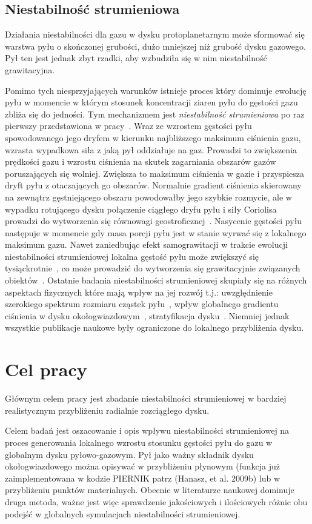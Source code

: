 \subsection{Niestabilność strumieniowa}
Działania niestabilności dla gazu w dysku protoplanetarnym może sformować
się warstwa pyłu o skończonej grubości, dużo mniejszej niż grubość dysku
gazowego. Pył ten jest jednak zbyt rzadki, aby wzbudziła się w nim
niestabilność grawitacyjna.
\par Pomimo tych niesprzyjających warunków istnieje proces który dominuje
ewolucję pyłu w momencie w którym stosunek koncentracji ziaren pyłu do gęstości
gazu zbliża się do jedności. Tym mechanizmem jest {\it niestabilność
strumieniowa} po raz pierwszy przedstawiona w pracy~\cite{YG05}.  Wraz ze
wzrostem gęstości pyłu spowodowanego jego dryfem w kierunku najbliższego
maksimum ciśnienia gazu, wzrasta wypadkowa siła z jaką pył oddziałuje na gaz.
Prowadzi to zwiększenia prędkości gazu i wzrostu ciśnienia na skutek zagarniania
obszarów gazów poruszających się wolniej. Zwiększa to maksimum ciśnienia w gazie
i przyspiesza dryft pyłu z otaczających go obszarów. Normalnie gradient ciśnienia
skierowany na zewnątrz gęstniejącego obszaru powodowałby jego szybkie rozmycie,
ale w wypadku rotującego dysku połączenie ciągłego dryfu pyłu i siły Coriolisa
prowadzi do wytworzenia się równowagi geostroficznej~\cite{jaquet}. Nasycenie
gęstości pyłu następuje w momencie gdy masa porcji pyłu jest w stanie wyrwać się
z lokalnego maksimum gazu.  Nawet zaniedbując efekt samograwitacji w trakcie
ewolucji niestabilności strumieniowej lokalna gęstość pyłu może zwiększyć się
tysiąckrotnie~\cite{JY07}, co może prowadzić do wytworzenia się grawitacyjnie
związanych obiektów~\cite{J07}. Ostatnie badania niestabilności strumieniowej
skupiały się na różnych aspektach fizycznych które mają wpływ na jej rozwój
t.j.: uwzględnienie szerokiego spektrum rozmiaru cząstek pyłu~\cite{BS10a},
wpływ globalnego gradientu ciśnienia w dysku okołogwiazdowym~\cite{BS10b},
stratyfikacja dysku~\cite{T12}. Niemniej jednak wszystkie publikacje naukowe
były ograniczone do lokalnego przybliżenia dysku.

\section{Cel pracy}
Głównym celem pracy jest zbadanie niestabilności strumieniowej w bardziej
realistycznym przybliżeniu radialnie rozciągłego dysku.

Celem badań jest oszacowanie i opis wpływu niestabilności strumieniowej na
proces generowania lokalnego wzrostu stosunku gęstości pyłu do gazu w globalnym
dysku pyłowo-gazowym. Pył jako ważny składnik dysku okołogwiazdowego można
opisywać w przybliżeniu płynowym (funkcja już zaimplementowana w kodzie PIERNIK
patrz (Hanasz, et al. 2009b) lub w przybliżeniu punktów materialnych. Obecnie w
literaturze naukowej dominuje druga  metoda, ważne jest więc sprawdzenie
jakościowych i ilościowych różnic obu podejść w globalnych symulacjach
niestabilności strumieniowej. 




